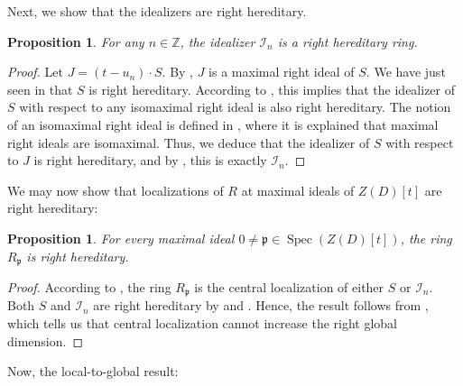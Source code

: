 \documentclass{amsart}
\newtheorem{prop}[equation]{Proposition}
\theoremstyle{definition}
\newcommand{\opn}{\operatorname}
\newcommand{\mfrak}[1]{\mathfrak{#1}}
\newcommand{\p}{\mfrak{p}}
\numberwithin{equation}{section}
\begin{document}
Next, we show that the idealizers are right hereditary.

\begin{prop}\label{prop:ihere}
For any $n \in \mathbb{Z}$,
the idealizer $\mathcal{I}_n$ is a right hereditary ring.
\end{prop}
\begin{proof}
Let $J = (t-u_n)\cdot S$.
By , $J$ is a maximal right ideal of $S$.
We have just seen in  that $S$ is right hereditary.
According to \cite[Theorem 5.5.8]{NCBook},
this implies that the idealizer of $S$ with respect to any isomaximal right ideal is also right hereditary.
The notion of an isomaximal right ideal is defined in \cite[5.5.2]{NCBook}, where it is explained that maximal right ideals are isomaximal.
Thus, we deduce that the idealizer of $S$ with respect to $J$ is right hereditary, and by , this is exactly $\mathcal{I}_n$.
\end{proof}

We may now show that localizations of $R$ at maximal ideals of $Z(D)[t]$ are right hereditary:
\begin{prop}\label{prop:locals-are-here}
For every maximal ideal $0 \ne \p \in \opn{Spec}(Z(D)[t])$,
the ring $R_{\p}$ is right hereditary.    
\end{prop}
\begin{proof}
According to ,
the ring $R_{\p}$ is the central localization of either $S$ or $\mathcal{I}_n$. 
Both $S$ and $\mathcal{I}_n$ are right hereditary by  and .
Hence, the result follows from \cite[Corollary 7.4.3]{NCBook},
which tells us that central localization cannot increase the right global dimension.
\end{proof}

Now, the local-to-global result:
\end{document}
